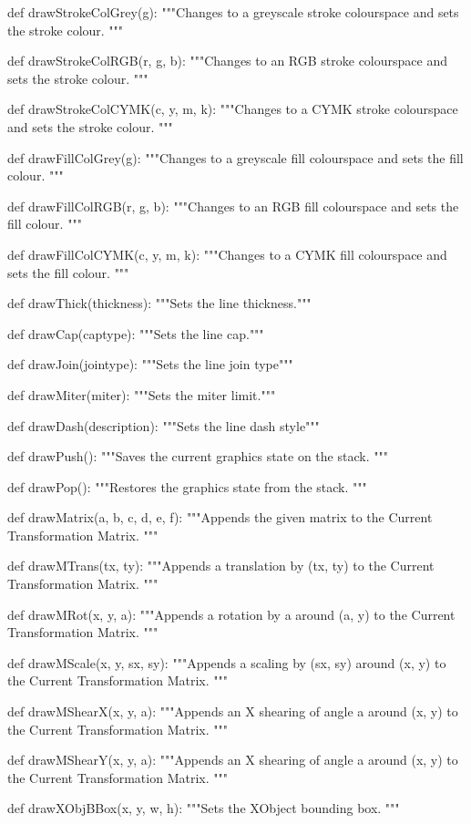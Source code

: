 def drawStrokeColGrey(g):
    """Changes to a greyscale stroke colourspace and sets the stroke colour.
    """

def drawStrokeColRGB(r, g, b):
    """Changes to an RGB stroke colourspace and sets the stroke colour. """

def drawStrokeColCYMK(c, y, m, k):
    """Changes to a CYMK stroke colourspace and sets the stroke colour. """

def drawFillColGrey(g):
    """Changes to a greyscale fill colourspace and sets the fill colour. """

def drawFillColRGB(r, g, b):
    """Changes to an RGB fill colourspace and sets the fill colour. """

def drawFillColCYMK(c, y, m, k):
    """Changes to a CYMK fill colourspace and sets the fill colour. """

def drawThick(thickness):
    """Sets the line thickness."""

def drawCap(captype):
    """Sets the line cap."""

def drawJoin(jointype):
    """Sets the line join type"""

def drawMiter(miter):
    """Sets the miter limit."""

def drawDash(description):
    """Sets the line dash style"""

def drawPush():
    """Saves the current graphics state on the stack. """

def drawPop():
    """Restores the graphics state from the stack. """

def drawMatrix(a, b, c, d, e, f):
    """Appends the given matrix to the Current Transformation Matrix. """

def drawMTrans(tx, ty):
    """Appends a translation by (tx, ty) to the Current Transformation Matrix.
    """

def drawMRot(x, y, a):
    """Appends a rotation by a around (a, y) to the Current Transformation
    Matrix. """

def drawMScale(x, y, sx, sy):
    """Appends a scaling by (sx, sy) around (x, y) to the Current
    Transformation Matrix. """

def drawMShearX(x, y, a):
    """Appends an X shearing of angle a around (x, y) to the Current
    Transformation Matrix. """

def drawMShearY(x, y, a):
    """Appends an X shearing of angle a around (x, y) to the Current
    Transformation Matrix. """

def drawXObjBBox(x, y, w, h):
    """Sets the XObject bounding box. """

